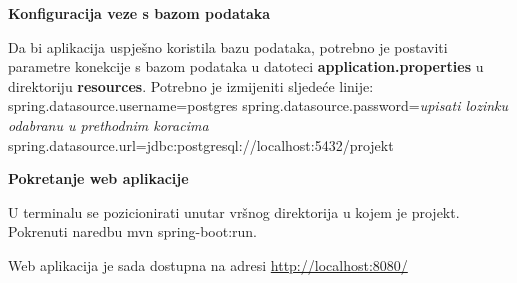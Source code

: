 		\noindent \textbf{Konfiguracija veze s bazom podataka}
		
		Da bi aplikacija uspješno koristila bazu podataka, potrebno je postaviti parametre konekcije s bazom podataka u datoteci \textbf{application.properties} u direktoriju \textbf{resources}. Potrebno je izmijeniti sljedeće linije:
		\newline
		spring.datasource.username=postgres
		\newline
        spring.datasource.password=\textit{upisati lozinku odabranu u prethodnim koracima}
        \newline
        spring.datasource.url=jdbc:postgresql://localhost:5432/projekt

        \newline
        \newline
        \textbf{}
		
		\noindent \textbf{Pokretanje web aplikacije}
			
			U terminalu se pozicionirati unutar vršnog direktorija u kojem je projekt. Pokrenuti naredbu mvn spring-boot:run.
			
			Web aplikacija je sada dostupna na adresi \url{http://localhost:8080/}
			
			
			
	
			\eject 
